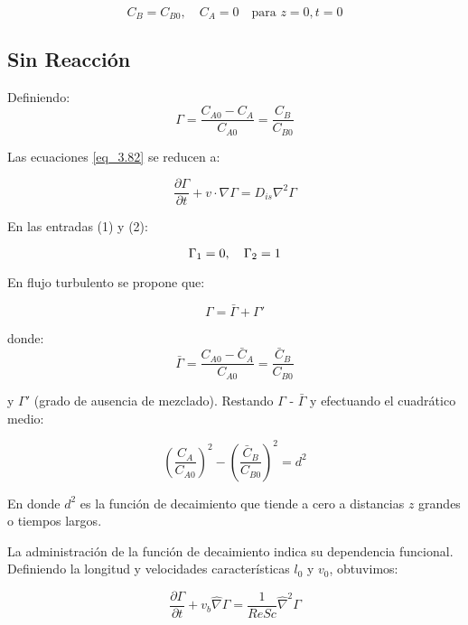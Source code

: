 \begin{equation}
    C_B = C_{B0}, \quad C_A = 0 \quad \text{para } z=0, t=0
\end{equation}

\subsection{Sin Reacción}

Definiendo:
\begin{equation}
    \Gamma = \frac{C_{A0} - C_A}{C_{A0}} = \frac{C_B}{C_{B0}}
\end{equation}

Las ecuaciones \eqref{eq_3.82} se reducen a:

\begin{equation}
    \frac{\partial \Gamma}{\partial t} + v \cdot \nabla \Gamma = D_{is} \nabla^2 \Gamma
\end{equation}

En las entradas (1) y (2):

\begin{equation}
    \Gamma_1 = 0, \quad \Gamma_2 = 1 \notag
\end{equation}

En flujo turbulento se propone que:

\begin{equation}
    \Gamma = \bar{\Gamma} + \Gamma'
\end{equation}

donde:
\begin{equation}
   \bar{\Gamma} = \frac{C_{A0} - \bar{C}_A}{C_{A0}} = \frac{\bar{C}_B}{C_{B0}}
\end{equation}




y $\Gamma'$ (grado de ausencia de mezclado). Restando $\Gamma$ - $\bar{\Gamma}$  y efectuando el cuadrático medio:

\begin{equation}
    \left( \frac{C_A}{C_{A0}} \right)^2 - \left( \frac{\bar{C}_B}{C_{B0}} \right)^2 = d^2
\end{equation}

En donde $d^2$ es la función de decaimiento que tiende a cero a distancias $z$ grandes o tiempos largos.


La administración de la función de decaimiento indica su dependencia funcional. Definiendo la longitud y velocidades características $l_{0}$ y $v_{0}$, obtuvimos:

\begin{equation}
    \frac{\partial\Gamma}{\partial t} + v_{b}\hat{\nabla}\Gamma = \frac{1}{Re Sc}\hat{\nabla}^{2}\Gamma  \label{eq_3.89}
\end{equation}


